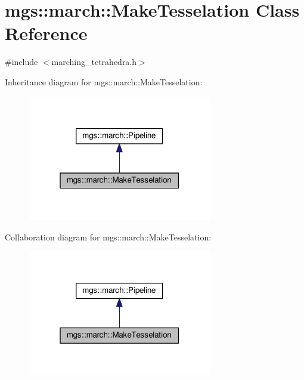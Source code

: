 \hypertarget{classmgs_1_1march_1_1MakeTesselation}{}\section{mgs\+:\+:march\+:\+:Make\+Tesselation Class Reference}
\label{classmgs_1_1march_1_1MakeTesselation}


{\ttfamily \#include $<$marching\+\_\+tetrahedra.\+h$>$}



Inheritance diagram for mgs\+:\+:march\+:\+:Make\+Tesselation\+:
\nopagebreak
\begin{figure}[H]
\begin{center}
\leavevmode
\includegraphics[width=229pt]{classmgs_1_1march_1_1MakeTesselation__inherit__graph}
\end{center}
\end{figure}


Collaboration diagram for mgs\+:\+:march\+:\+:Make\+Tesselation\+:
\nopagebreak
\begin{figure}[H]
\begin{center}
\leavevmode
\includegraphics[width=229pt]{classmgs_1_1march_1_1MakeTesselation__coll__graph}
\end{center}
\end{figure}
